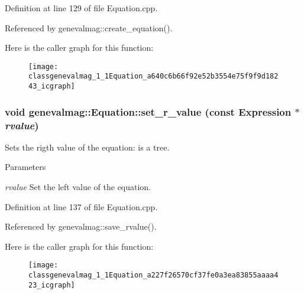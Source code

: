 Definition at line 129 of file Equation.cpp.



Referenced by genevalmag::create\_\-equation().



Here is the caller graph for this function:\nopagebreak
\begin{figure}[H]
\begin{center}
\leavevmode
\texttt{[image: classgenevalmag\_1\_1Equation\_a640c6b66f92e52b3554e75f9f9d18243\_icgraph]}
\end{center}
\end{figure}


\hypertarget{classgenevalmag_1_1Equation_a227f26570cf37fe0a3ea83855aaaa423}{
\subsubsection[{set\_\-r\_\-value}]{\setlength{\rightskip}{0pt plus 5cm}void genevalmag::Equation::set\_\-r\_\-value (const {\bf Expression} $\ast$ {\em rvalue})}}
\label{classgenevalmag_1_1Equation_a227f26570cf37fe0a3ea83855aaaa423}
Sets the rigth value of the equation: is a tree. 
\begin{DoxyParams}{Parameters}
\item[{\em rvalue}]Set the left value of the equation. \end{DoxyParams}


Definition at line 137 of file Equation.cpp.



Referenced by genevalmag::save\_\-rvalue().



Here is the caller graph for this function:\nopagebreak
\begin{figure}[H]
\begin{center}
\leavevmode
\texttt{[image: classgenevalmag\_1\_1Equation\_a227f26570cf37fe0a3ea83855aaaa423\_icgraph]}
\end{center}
\end{figure}


